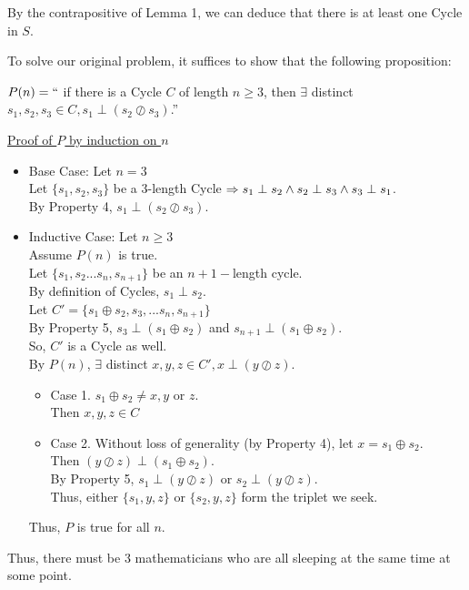 \documentclass[fleqn]{article}
\newcommand{\set}[1]{\lbrace #1 \rbrace}
\newcommand{\iunion}{\oplus}
\newcommand{\iinter}{\oslash}
\newcommand{\ioverlap}{\perp}
\begin{document}
By the contrapositive of Lemma 1, we can deduce that there is at least one Cycle in $S$. 

To solve our original problem, it suffices to show that the following proposition:

$P(n)=``$ if there is a Cycle $C$ of length $n \geq 3$, then $\exists$ distinct $s_1, s_2, s_3 \in C, s_1 \ioverlap (s_2 \iinter s_3)$.''

\underline{Proof of $P$ by induction on $n$}
\begin{itemize}
  \item Base Case: Let $n = 3$\\
        Let $\set{s_1,s_2,s_3}$ be a 3-length Cycle $\Rightarrow\\
        s_1 \ioverlap s_2 \wedge s_2 \ioverlap s_3 \wedge s_3 \ioverlap s_1$.\\
        By Property 4, $s_1 \ioverlap (s_2 \iinter s_3)$.
  \item Inductive Case: Let $n \geq 3$\\
        Assume $P(n)$ is true.\\
        Let $\set{s_1,s_2...s_n,s_{n+1}}$ be an $n+1-$length cycle.\\
        By definition of Cycles, $s_1 \ioverlap s_2$.\\
        Let $C' = \set{s_1 \iunion s_2, s_3,...s_n, s_{n+1}}$\\
        By Property 5, $s_3 \ioverlap (s_1 \iunion s_2)$ and 
                       $s_{n+1} \ioverlap (s_1 \iunion s_2)$.\\
        So, $C'$ is a Cycle as well.\\
        By $P(n)$, $\exists$ distinct $x,y,z \in C', x \ioverlap (y \iinter z)$.

        \begin{itemize}
          \item Case 1. $s_1 \iunion s_2 \not= x,y $ or $z$. \\
                Then $x,y,z \in C$
          \item Case 2. Without loss of generality (by Property 4), let 
                $x = s_1 \iunion s_2$.\\
                Then $(y \iinter z) \ioverlap (s_1 \iunion s_2)$.\\
                By Property 5, $s_1 \ioverlap (y \iinter z)$ or
                               $s_2 \ioverlap (y \iinter z)$.\\
                Thus, either $\set{s_1,y,z}$ or $\set{s_2,y,z}$ form
                the triplet we seek.
        \end{itemize}
        
        Thus, $P$ is true for all $n$.
        
\end{itemize} 
       
Thus, there must be 3 mathematicians who are all sleeping at the same time at some point.
\end{document}
